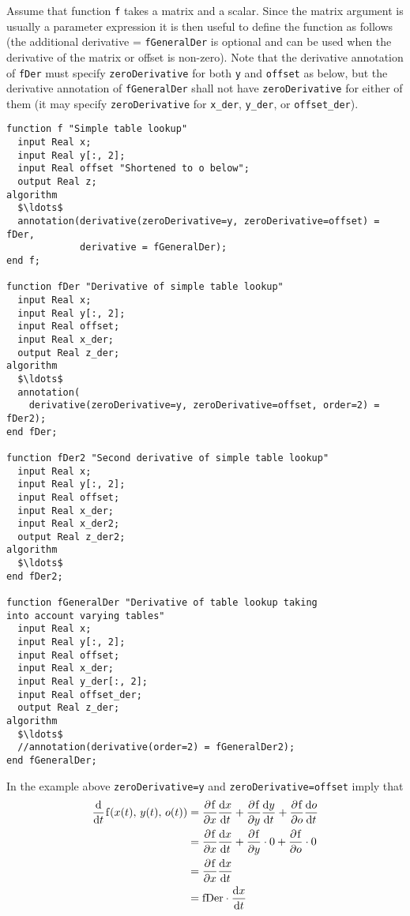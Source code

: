 \begin{nonnormative}
Assume that function {\lstinline!f!} takes a matrix and a scalar.
Since the matrix argument is usually a parameter expression it is then useful to define the function as follows (the additional derivative = {\lstinline!fGeneralDer!} is optional and can be used when the derivative of the matrix or offset is non-zero).
Note that the derivative annotation of {\lstinline!fDer!} must specify {\lstinline!zeroDerivative!} for both {\lstinline!y!} and {\lstinline!offset!} as below, but the derivative annotation of {\lstinline!fGeneralDer!} shall not have {\lstinline!zeroDerivative!} for either of them (it may specify {\lstinline!zeroDerivative!} for {\lstinline!x_der!}, {\lstinline!y_der!}, or {\lstinline!offset_der!}).

\begin{lstlisting}[language=modelica]
function f "Simple table lookup"
  input Real x;
  input Real y[:, 2];
  input Real offset "Shortened to o below";
  output Real z;
algorithm
  $\ldots$
  annotation(derivative(zeroDerivative=y, zeroDerivative=offset) = fDer,
             derivative = fGeneralDer);
end f;

function fDer "Derivative of simple table lookup"
  input Real x;
  input Real y[:, 2];
  input Real offset;
  input Real x_der;
  output Real z_der;
algorithm
  $\ldots$
  annotation(
    derivative(zeroDerivative=y, zeroDerivative=offset, order=2) = fDer2);
end fDer;

function fDer2 "Second derivative of simple table lookup"
  input Real x;
  input Real y[:, 2];
  input Real offset;
  input Real x_der;
  input Real x_der2;
  output Real z_der2;
algorithm
  $\ldots$
end fDer2;

function fGeneralDer "Derivative of table lookup taking
into account varying tables"
  input Real x;
  input Real y[:, 2];
  input Real offset;
  input Real x_der;
  input Real y_der[:, 2];
  input Real offset_der;
  output Real z_der;
algorithm
  $\ldots$
  //annotation(derivative(order=2) = fGeneralDer2);
end fGeneralDer;
\end{lstlisting}
In the example above {\lstinline!zeroDerivative=y!} and {\lstinline!zeroDerivative=offset!} imply that
\begin{equation*}
\begin{aligned}
\udfrac{}{t}\text{{\lstinline!f!}}(x(t),\, y(t),\, o(t))
&= \pdfrac{\text{{\lstinline!f!}}}{x} \udfrac{x}{t} + \pdfrac{\text{{\lstinline!f!}}}{y} \udfrac{y}{t} + \pdfrac{\text{{\lstinline!f!}}}{o} \udfrac{o}{t}\\
&= \pdfrac{\text{{\lstinline!f!}}}{x} \udfrac{x}{t} + \pdfrac{\text{{\lstinline!f!}}}{y} \cdot 0 + \pdfrac{\text{{\lstinline!f!}}}{o} \cdot 0\\
&= \pdfrac{\text{{\lstinline!f!}}}{x} \udfrac{x}{t}\\
&= \text{{\lstinline!fDer!}} \cdot \udfrac{x}{t}
\end{aligned}
\end{equation*}
\end{nonnormative}


